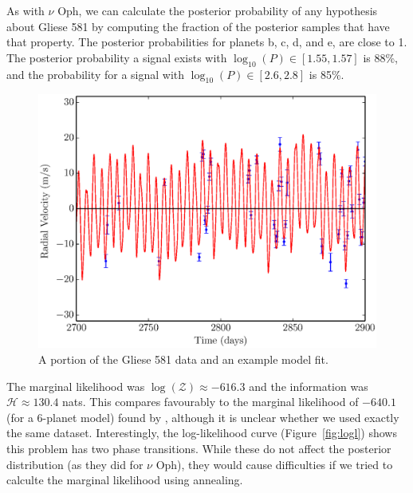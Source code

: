 \documentclass[useAMS,usenatbib]{mn2e}
\begin{document}
As with $\nu$ Oph, we can calculate the posterior probability of any hypothesis
about Gliese 581 by computing the fraction of the posterior samples that have
that property. The posterior probabilities for planets b, c, d, and e, are
close to 1. The posterior probability a signal exists with $\log_{10}(P)
\in [1.55, 1.57]$ is 88\%, and the probability for a signal with
$\log_{10}(P) \in [2.6, 2.8]$ is 85\%.

\begin{figure}
\includegraphics[scale=0.45]{Figures/gliese581.eps}
\caption{A portion of the Gliese 581 data and an example model fit.
\label{fig:gliese581}}
\end{figure}

The marginal likelihood was $\log(\mathcal{Z}) \approx -616.3$ and the
information was $\mathcal{H} \approx 130.4$ nats. This compares favourably
to the marginal likelihood of $-640.1$ (for a 6-planet model)
found by \citet{fengji}, although it is unclear whether we used exactly the
same dataset.
Interestingly, the log-likelihood curve (Figure~\ref{fig:logl})
shows this problem has two phase transitions. While these do not affect the
posterior distribution (as they did for $\nu$ Oph), they would cause difficulties
if we tried to calculte the marginal likelihood using annealing.
\end{document}
